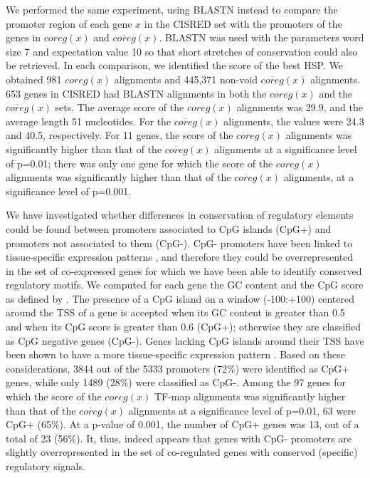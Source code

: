 We performed the same experiment, using BLASTN \citep{altschul:1990a} 
instead to compare the promoter region of each gene $x$ in the CISRED set 
with the promoters of the genes in $coreg(x)$ and $\overline{coreg}(x)$. 
BLASTN was used with the parameters word size 7 and expectation value 10 
so that short stretches of conservation could also be retrieved. In each 
comparison, we identified the score of the best HSP. We obtained 981 $coreg(x)$
alignments and 445,371 non-void $\overline{coreg}(x)$ alignments.
653 genes in CISRED had BLASTN alignments in both the 
$coreg(x)$ and the $\overline{coreg}(x)$ sets. The
average score of the $coreg(x)$ alignments was 29.9, and the average
length 51 nucleotides. For the $\overline{coreg}(x)$ alignments, the values 
were 24.3 and 40.5, respectively. For 11 genes,
the score of the $coreg(x)$ alignments was significantly
higher than that of the $\overline{coreg}(x)$ alignments at a
significance level of p=0.01;  there was
only one gene for which the score of the $coreg(x)$ alignments was 
significantly higher than that of the $\overline{coreg}(x)$ alignments,
at a significance level of p=0.001. 

We have investigated whether differences in conservation of regulatory
elements could be found between promoters associated to CpG islands
(CpG+) and promoters not associated to them (CpG-). CpG- promoters
have been linked to tissue-specific expression patterns 
\citep{smale:2003a}, and therefore they could be
overrepresented in the set of co-expressed genes for which we have
been able to identify conserved regulatory motifs. 
We computed for each gene the GC content and the CpG score as defined by
\citet{yamashita:2005a}. The presence of a CpG island on a window (-100:+100)
centered around the TSS of a gene is accepted when its GC content is
greater than 0.5 and when its CpG score is greater than 0.6 (CpG+); 
otherwise they are classified as CpG
negative genes (CpG-). Genes lacking CpG islands around their TSS have been
shown to have a more tissue-specific expression pattern
\citep{yamashita:2005a}. 
Based on these considerations, 3844 out of the 5333 promoters (72\%)
were identified as CpG+ genes, while only 1489 (28\%) were classified as
CpG-. Among the 97 genes for which  
the score of the $coreg(x)$ TF-map alignments was significantly
higher than that of the $\overline{coreg}(x)$ alignments at a
significance level of p=0.01, 63 were CpG+ (65\%). At a p-value of
0.001, the number of CpG+ genes was 13, out of a total of 23 (56\%).
It, thus, indeed appears that genes with CpG- promoters are slightly
overrepresented in the set of co-regulated genes with conserved
(specific) regulatory signals.

